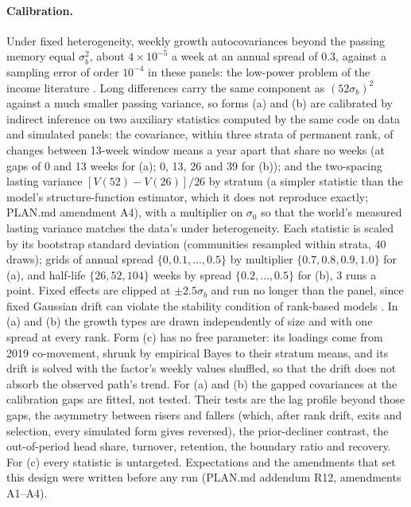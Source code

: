\documentclass[10pt]{article}
\begin{document}
\paragraph{Calibration.} Under fixed heterogeneity, weekly growth autocovariances beyond the passing memory equal $\sigma_b^2$, about $4\times10^{-5}$ a week at an annual spread of 0.3, against a sampling error of order $10^{-4}$ in these panels: the low-power problem of the income literature \cite{guvenen2009,hryshko2012}. Long differences carry the same component as $(52\sigma_b)^2$ against a much smaller passing variance, so forms (a) and (b) are calibrated by indirect inference \cite{gourieroux1993,guvenen2014} on two auxiliary statistics computed by the same code on data and simulated panels: the covariance, within three strata of permanent rank, of changes between 13-week window means a year apart that share no weeks (at gaps of 0 and 13 weeks for (a); 0, 13, 26 and 39 for (b)); and the two-spacing lasting variance $[V(52)-V(26)]/26$ by stratum (a simpler statistic than the model's structure-function estimator, which it does not reproduce exactly; PLAN.md amendment A4), with a multiplier on $\sigma_0$ so that the world's measured lasting variance matches the data's under heterogeneity. Each statistic is scaled by its bootstrap standard deviation (communities resampled within strata, 40 draws); grids of annual spread $\{0, 0.1, \ldots, 0.5\}$ by multiplier $\{0.7, 0.8, 0.9, 1.0\}$ for (a), and half-life $\{26, 52, 104\}$ weeks by spread $\{0.2, \ldots, 0.5\}$ for (b), 3 runs a point. Fixed effects are clipped at $\pm 2.5\sigma_b$ and run no longer than the panel, since fixed Gaussian drift can violate the stability condition of rank-based models \cite{fik2013}. In (a) and (b) the growth types are drawn independently of size and with one spread at every rank. Form (c) has no free parameter: its loadings come from 2019 co-movement, shrunk by empirical Bayes to their stratum means, and its drift is solved with the factor's weekly values shuffled, so that the drift does not absorb the observed path's trend. For (a) and (b) the gapped covariances at the calibration gaps are fitted, not tested. Their tests are the lag profile beyond those gaps, the asymmetry between risers and fallers (which, after rank drift, exits and selection, every simulated form gives reversed), the prior-decliner contrast, the out-of-period head share, turnover, retention, the boundary ratio and recovery. For (c) every statistic is untargeted. Expectations and the amendments that set this design were written before any run (PLAN.md addendum R12, amendments A1--A4).
\end{document}
